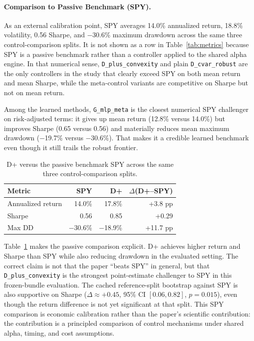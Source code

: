 \documentclass[11pt]{article}
\begin{document}
\paragraph{Comparison to Passive Benchmark (SPY).}
As an external calibration point, SPY averages 14.0\% annualized return,
18.8\% volatility, 0.56 Sharpe, and $-$30.6\% maximum drawdown across the same
three control-comparison splits. It is not shown as a row in
Table~\ref{tab:metrics} because SPY is a passive benchmark rather than a
controller applied to the shared alpha engine. In that numerical sense,
\texttt{D\_plus\_convexity} and plain \texttt{D\_cvar\_robust} are the only
controllers in the study that clearly exceed SPY on both mean return and mean
Sharpe, while the meta-control variants are competitive on Sharpe but not on
mean return.

Among the learned methods, \texttt{G\_mlp\_meta} is the closest numerical SPY
challenger on risk-adjusted terms: it gives up mean return (12.8\% versus
14.0\%) but improves Sharpe (0.65 versus 0.56) and materially reduces mean
maximum drawdown ($-$19.7\% versus $-$30.6\%). That makes it a credible learned
benchmark even though it still trails the robust frontier.

\begin{table}[t]
\centering
\small
\caption{D+ versus the passive benchmark SPY across the same three
control-comparison splits.}
\label{tab:dplus_spy}
\begin{tabular}{@{} l r r r @{}}
\toprule
\textbf{Metric} & \textbf{SPY} & \textbf{D+} & \textbf{$\Delta$(D+--SPY)} \\
\midrule
Annualized return & 14.0\% & 17.8\% & +3.8 pp \\
Sharpe & 0.56 & 0.85 & +0.29 \\
Max DD & $-$30.6\% & $-$18.9\% & +11.7 pp \\
\bottomrule
\end{tabular}
\end{table}

Table~\ref{tab:dplus_spy} makes the passive comparison explicit. D+ achieves
higher return and Sharpe than SPY while also reducing drawdown in the evaluated
setting. The correct claim is not that the paper ``beats SPY'' in general, but
that \texttt{D\_plus\_convexity} is the strongest point-estimate challenger to
SPY in this frozen-bundle evaluation. The cached reference-split bootstrap
against SPY is also supportive on Sharpe ($\Delta \approx +0.45$,
95\% CI $[0.06, 0.82]$, $p=0.015$), even though the return difference is not
yet significant at that split. This SPY comparison is economic calibration
rather than the paper's scientific contribution: the contribution is a
principled comparison of control mechanisms under shared alpha, timing, and
cost assumptions.
\end{document}
